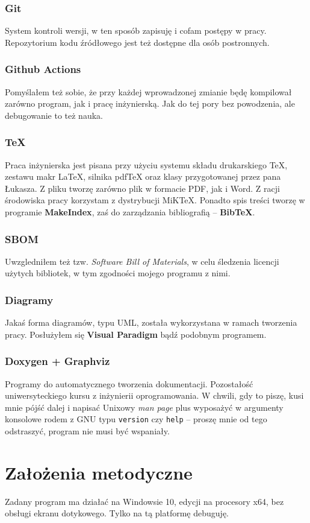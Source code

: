 \documentclass{SGGW-thesis}
\begin{document}
\subsection{Git}
System kontroli wersji, w ten sposób zapisuję i cofam postępy w pracy. Repozytorium kodu źródłowego jest też dostępne dla osób postronnych.
\subsection{Github Actions}
Pomyślałem też sobie, że przy każdej wprowadzonej zmianie będę kompilował zarówno program, jak i pracę inżynierską. Jak do tej pory bez powodzenia, ale debugowanie to też nauka.
\subsection{\TeX}
Praca inżynierska jest pisana przy użyciu systemu składu drukarskiego \TeX, zestawu makr \LaTeX, silnika pdfTeX oraz klasy przygotowanej przez pana Łukasza. Z pliku tworzę zarówno plik w formacie PDF, jak i Word. Z racji środowiska pracy korzystam z dystrybucji MiKTeX. Ponadto spis treści tworzę w programie \textbf{MakeIndex}, zaś do zarządzania bibliografią -- \textbf{BibTeX}.
\subsection{SBOM}
Uwzgledniłem też tzw. \textit{Software Bill of Materials}, w celu śledzenia licencji użytych bibliotek, w tym zgodności mojego programu z nimi.
\subsection{Diagramy}
Jakaś forma diagramów, typu UML, została wykorzystana w ramach tworzenia pracy. Posłużyłem się \textbf{Visual Paradigm} bądź podobnym programem.
\subsection{Doxygen + Graphviz}
Programy do automatycznego tworzenia dokumentacji. Pozostałość uniwersyteckiego kursu z inżynierii oprogramowania. W chwili, gdy to piszę, kusi mnie pójść dalej i napisać Unixowy \textit{man page} plus wyposażyć w argumenty konsolowe rodem z GNU typu \texttt{\-\-version} czy \texttt{\-\-help} -- proszę mnie od tego odstraszyć, program nie musi być wspaniały.

\chapter{Założenia metodyczne}
Zadany program ma działać na Windowsie 10, edycji na procesory x64, bez obsługi ekranu dotykowego. Tylko na tą platformę debuguję.
\end{document}
